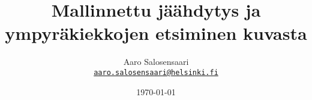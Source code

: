 \documentclass[11pt,a4paper,leqno]{report}
\newcommand{\Author}{Aaro Salosensaari}
\newcommand{\Title}{Mallinnettu jäähdytys ja ympyräkiekkojen etsiminen kuvasta}
\begin{document}
    \title{\Title}

    \author{\Author\\
        \small{ \texttt{\href{mailto:aaro.salosensaari@helsinki.fi}{aaro.salosensaari@helsinki.fi}}}
    }

    \date{\today}


    

    \tableofcontents

    
    
    
    
    
    

    \printbibliography[heading=bibintoc]
\end{document}
